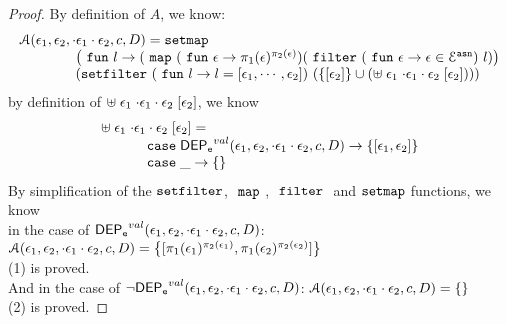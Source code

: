 \begin{proof}
By definition of $A$, we know:
%
\[
	\begin{array}{l}
	\mathcal{A}(\event_1, \event_2, \cdot \event_1 \cdot \event_2, c, D)
	= 
	\kw{setmap} ~
	\\ \qquad \qquad
	\left(\efun l \to ( \emap 
		(\efun  \event \to \pi_1(\event)^{\pi_2(\event)})
	(\efilter 
		(\efun \event \to  \event \in \eventset^{\asn}) ~ l) \right)
	\\ \qquad \qquad
	(\kw{setfilter} ~
		(\efun l \to l = [\event_1, \cdots, \event_2]) ~ 
		\left(\left\{[\event_2]\right\} \cup \left(  {\uplus} \eapp \event_1 \eapp {\cdot \event_1 \cdot \event_2} \eapp [\event_2] \right) \right))
	\end{array}
\]
by definition of $ {\uplus} \; \mathtt{\epsilon}_1 \; {\cdot \mathtt{\epsilon}_1 \cdot \mathtt{\epsilon}_2} \; [\mathtt{\epsilon}_2]  $, we know 
\[
	\begin{array}{l}
	{\uplus} \eapp \event_1 \eapp {\cdot \event_1 \cdot \event_2} \eapp [\event_2] 
	=   
	\\ \quad \qquad 	
	\ecase \eventdep^{val}(\event_1, \event_2, \cdot \event_1 \cdot \event_2, c, D)
	\to \left\{ [\event_1, \event_2] \right\}
	\\ \quad \qquad 	
	\ecase \_
	\to \left\{ \right\}
\end{array}
\]
%
By simplification of the $\mathtt{setfilter}$, $~\mathtt{map}~$, $~\mathtt{filter}~$ and $\mathtt{setmap}$ functions, we know
\\
in the case of $\mathsf{DEP_{\mathtt{e}}}^{val}(\mathtt{\epsilon}_1, \mathtt{\epsilon}_2, \cdot \mathtt{\epsilon}_1 \cdot \mathtt{\epsilon}_2, c, D)$:
$\mathcal{A}(\event_1, \event_2, \cdot \event_1 \cdot \event_2, c, D) = 
  \left\{[\pi_1(\event_1)^{\pi_2(\event_1)}, \pi_1(\event_2)^{\pi_2(\event_2)}] \right \}$
\\
(1) is proved.
\\
And in the case of $\neg \mathsf{DEP_{\mathtt{e}}}^{val}(\mathtt{\epsilon}_1, \mathtt{\epsilon}_2, \cdot \mathtt{\epsilon}_1 \cdot \mathtt{\epsilon}_2, c, D)$: 
$\mathcal{A}(\event_1, \event_2, \cdot  \event_1 \cdot \event_2, c, D) = 
  \left\{ \right \}$
\\
(2) is proved.
\end{proof}
%
%
